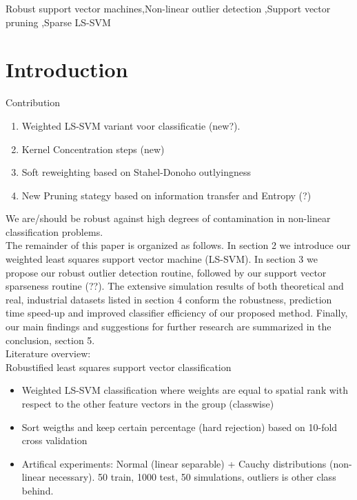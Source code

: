 \documentclass[preprint,12pt]{elsarticle}
\begin{document}
\begin{frontmatter}
\begin{abstract}
\end{abstract}

\begin{keyword}
	Robust support vector machines\sep Non-linear outlier detection \sep Support vector pruning \sep Sparse LS-SVM 
\end{keyword}
\end{frontmatter}


\newpage
\section{Introduction}

Contribution
\begin{enumerate}
	\item Weighted LS-SVM variant voor classificatie (new?).
	\item Kernel Concentration steps (new)
	\item Soft reweighting based on Stahel-Donoho outlyingness
	\item New Pruning stategy based on information transfer and Entropy (?)
\end{enumerate}
We are/should be robust against high degrees of contamination in non-linear classification problems. \\

The remainder of this paper is organized as follows. In section 2 we introduce our weighted least squares support vector machine (LS-SVM). In section 3 we propose our robust outlier detection routine, followed by our support vector sparseness routine (??). The extensive simulation results of both theoretical and real, industrial datasets listed in section 4 conform the robustness, prediction time speed-up and improved classifier efficiency of our proposed method. Finally, our main findings and suggestions for further research are summarized in the conclusion, section 5. \\

Literature overview: \\

Robustified least squares support vector classification~\cite{debruyne2009robustified}
	\begin{itemize}
		\item Weighted LS-SVM classification where weights are equal to spatial rank with respect to the other feature vectors in the group (classwise)
		\item Sort weigths and keep certain percentage (hard rejection) based on 10-fold cross validation
		\item Artifical experiments: Normal (linear separable) + Cauchy distributions (non-linear necessary). 50  train, 1000 test, 50 simulations, outliers is other class behind.
	\end{itemize}
	
\end{document}
